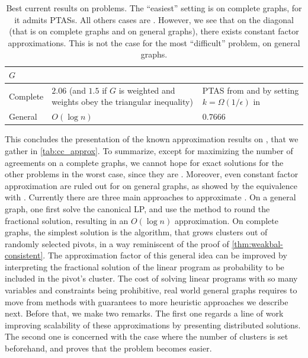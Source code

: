 \begin{table}
   \caption{Best current results on \pcc{} problems. The \enquote{easiest} setting is \maxa{} on
      complete graphs, for it admits PTASs. All others cases are \APXh{}. However, we see that on
      the diagonal (that is \mind{} on complete graphs and \maxa{} on general graphs), there exists
      constant factor approximations. This is not the case for the most \enquote{difficult} problem,
      \mind{} on general graphs. \label{tab:cc_approx}}
   \begin{tabulary}{\textwidth}{lLL}
      \toprule
      $G$      &  \mind{}                                                  & \maxa{}                                 \\
      \midrule
      Complete &  $2.06$ (and $1.5$ if $G$ is weighted and weights obey the triangular inequality) \autocite{Chawla2014}
               & PTAS from \textcite{Bansal2002} and by setting $k=\Omega(1/\epsilon)$ in \autocite{Giotis2006}      \\
      General  &  $O(\log n)$ \autocite{Charikar2003}                      & $0.7666$ \autocite{Swamy2004}           \\
      \bottomrule
   \end{tabulary}
\end{table}

\medskip

This concludes the presentation of the known approximation results on \pcc{}, that we gather in
\autoref{tab:cc_approx}.
To summarize, except for maximizing the number of agreements on a complete graphs, we cannot hope
for exact solutions for the other problems in the worst case, since they are \APXh{}. Moreover, even
constant factor approximation are ruled out for \mind{} on general graphs, as showed by the
equivalence with \mmc{}.
Currently there are three main approaches to approximate \mind{}. On a general graph,
one first solve the canonical LP, and use the \regionGrow{} method to round the fractional solution,
resulting in an $O(\log n)$ approximation. On complete graphs, the simplest solution is the
\ccpivot{} algorithm, that grows clusters out of randomly selected pivots, in a way reminiscent of
the proof of \autoref{thm:weakbal-consistent}. The approximation factor of this general idea can be
improved by interpreting the fractional solution of the linear program as probability to be included
in the pivot's cluster. The cost of solving linear programs with so many variables and constraints
being prohibitive, real world general graphs requires to move from methods with guarantees to more
heuristic approaches we describe next. Before that, we make two remarks. The first one regards a
line of work improving scalability of these approximations by presenting distributed solutions. The
second one is concerned with the case where the number of clusters is set beforehand, and proves
that the problem becomes easier.

